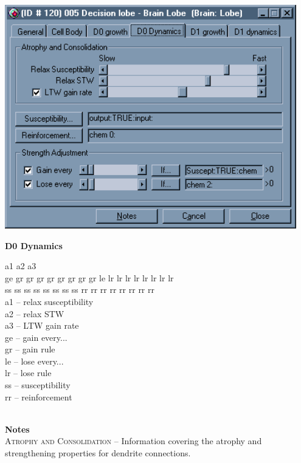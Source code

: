 \documentclass[11pt,twoside,a4paper]{article}
\begin{document}
\begin{minipage}[ht]{0.40\textwidth}
	\includegraphics[width=0.95\textwidth]{img/gen00k4.png}
\end{minipage} \hfill \begin{minipage}[ht]{0.575\textwidth}
	\textbf{\large D0 Dynamics} %

	a1 a2 a3 ~\\
	ge gr gr gr gr gr gr gr gr le lr lr lr lr lr lr lr lr ~\\
	ss ss ss ss ss ss ss ss rr rr rr rr rr rr rr rr ~\\

	a1 -- relax susceptibility ~\\
	a2 -- relax STW ~\\
	a3 -- LTW gain rate ~\\
	ge -- gain every... ~\\
	gr -- gain rule ~\\
	le -- lose every... ~\\
	lr -- lose rule ~\\
	ss -- susceptibility ~\\
	rr -- reinforcement ~\\
\end{minipage} ~\\

\textbf{\large Notes}~\\

\textsc{Atrophy and Consolidation} -- Information covering the atrophy and strengthening properties for dendrite connections. ~\\
\end{document}
